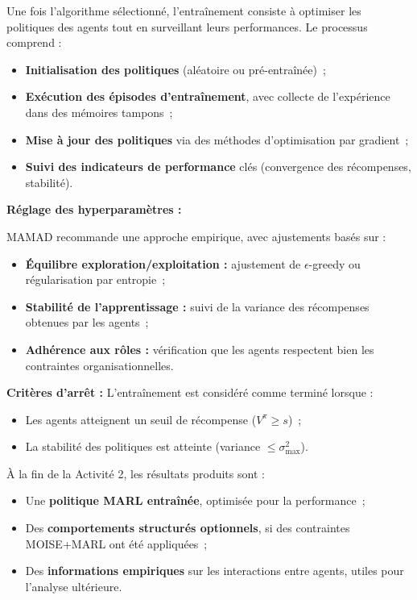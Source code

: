 Une fois l'algorithme sélectionné, l'entraînement consiste à optimiser les politiques des agents tout en surveillant leurs performances. Le processus comprend :

\begin{itemize}
    \item \textbf{Initialisation des politiques} (aléatoire ou pré-entraînée)~;
    \item \textbf{Exécution des épisodes d'entraînement}, avec collecte de l'expérience dans des mémoires tampons~;
    \item \textbf{Mise à jour des politiques} via des méthodes d'optimisation par gradient~;
    \item \textbf{Suivi des indicateurs de performance} clés (convergence des récompenses, stabilité).
\end{itemize}

\vspace{0.4em}
\noindent \textbf{Réglage des hyperparamètres :}

MAMAD recommande une approche empirique, avec ajustements basés sur :

\begin{itemize}
    \item \textbf{Équilibre exploration/exploitation :} ajustement de $\epsilon$-greedy ou régularisation par entropie~;
    \item \textbf{Stabilité de l'apprentissage :} suivi de la variance des récompenses obtenues par les agents~;
    \item \textbf{Adhérence aux rôles :} vérification que les agents respectent bien les contraintes organisationnelles.
\end{itemize}

\vspace{0.4em}
\noindent \textbf{Critères d'arrêt :}
L'entraînement est considéré comme terminé lorsque :

\begin{itemize}
    \item Les agents atteignent un seuil de récompense ($V^{\pi} \geq s$)~;
    \item La stabilité des politiques est atteinte (variance $\leq \sigma_{\max}^2$).
\end{itemize}

\vspace{0.4em}
\noindent À la fin de la Activité 2, les résultats produits sont :
\begin{itemize}
    \item Une \textbf{politique MARL entraînée}, optimisée pour la performance~;
    \item Des \textbf{comportements structurés optionnels}, si des contraintes MOISE+MARL ont été appliquées~;
    \item Des \textbf{informations empiriques} sur les interactions entre agents, utiles pour l'analyse ultérieure.
\end{itemize}


